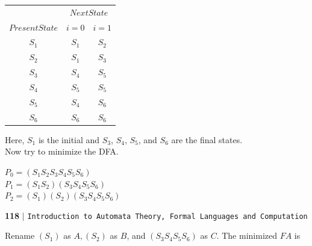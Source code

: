 \begin{center}
	\begin{tabular}{ccc}
		\hline
		
		\hline
		
		\hline
		
		\hline
		& \multicolumn{2}{c}{$Next State$}\\
		\cline{2-3}
		$Present State$ &  $i=0$ & $i=1$\\
		\hline
		$S_1$   &   $S_1$      &  $S_2$ \\
		$S_2$   &   $S_1$      &  $S_3$   \\
		$S_3$   &   $S_4$      &  $S_5$   \\
		$S_4$   &   $S_5$      &  $S_5$   \\
		$S_5$   &   $S_4$      &  $S_6$  \\
		$S_6$   &   $S_6$      &  $S_6$  \\
		\hline
		
		\hline
		
		\hline
		
		\hline
	\end{tabular}
\end{center}


Here, $S_1$ is the initial and $S_3$, $S_4$, $S_5$, and $S_6$ are the final states.\\
\hspace*{0.5cm} Now try to minimize the DFA.
\begin{center}
	$P_0 = (S_1 S_2 S_3 S_4 S_5 S_6)$\\
	$P_1 = (S_1 S_2)(S_3 S_4 S_5 S_6)$\\
	$P_2 = (S_1) (S_2) (S_3 S_4 S_5 S_6)$\\
\end{center}

\begin{flushleft}
	\textbf{118}\hspace*{0.1cm} \textbf{$|$} \hspace*{0.1cm} \texttt{Introduction to Automata Theory, Formal Languages and Computation}
\end{flushleft}
\vspace*{0.5cm}

Rename $(S_1)$ as $A, (S_2)$ as $B$, and $(S_3 S_4 S_5 S_6)$ as $C$. The minimized $FA$ is\\

